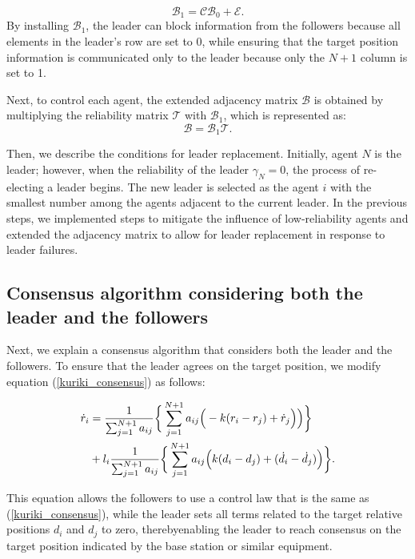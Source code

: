 \documentclass[a4paper,fleqn,10pt,twocolumn]{SICE_ISCS}
\begin{document}
\begin{equation}
	{\mathcal{B}}_1={\mathcal{C}}{\mathcal{B}}_0+{\mathcal{E}}.
\end{equation}
By installing ${\mathcal{B}}_1$, the leader can block information from the followers because all elements in the leader's row are set to 0, while ensuring that the target position information is communicated only to the leader because only the \(N+1\) column is set to 1.


Next, to control each agent, the extended adjacency matrix \(\mathcal{B}\) is obtained by multiplying the reliability matrix \(\mathcal{T}\) with \({\mathcal{B}}_1\), which is represented as: 
\begin{equation}
	{\mathcal{B}}={\mathcal{B}}_1\mathcal{T}.
\end{equation}

Then, we describe the conditions for leader replacement. Initially, agent \(N\) is the leader; however, when the reliability of the leader \(\gamma_N = 0\), the process of re-electing a leader begins. The new leader is selected as the agent \(i\) with the smallest number among the agents adjacent to the current leader. In the previous steps, we implemented steps to mitigate the influence of low-reliability agents and extended the adjacency matrix to allow for leader replacement in response to leader failures. 

\subsection{Consensus algorithm considering both the leader and the followers}
Next, we explain a consensus algorithm that considers both the leader and the followers. To ensure that the leader agrees on the target position, we modify equation (\ref{kuriki_consensus}) as follows:
\begin{small}
\begin{align}
	\dot{r}_i & =\frac{1}{\sum_{j=1}^{N+1}a_{ij}}
	\bigg\{\sum_{j=1}^{N+1}a_{ij}\Big(-k(r_i - r_j)+\dot{r}_j\Big)\Big)\bigg\}\notag\\
	& +l_i\frac{1}{\sum_{j=1}^{N+1}a_{ij}}
	\bigg\{\sum_{j=1}^{N+1}a_{ij}\Big(k(d_i-d_j)+(\dot{d}_i-\dot{d}_j)\Big)\bigg\}.	
\end{align}
\end{small}
This equation allows the followers to use a control law that is the same as (\ref{kuriki_consensus}), while the leader sets all terms related to the target relative positions \(d_i\) and \(d_j\) to zero, therebyenabling the leader to reach consensus on the target position indicated by the base station or similar equipment.
\end{document}
